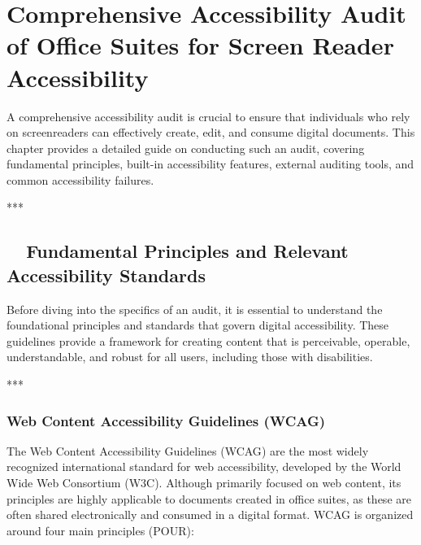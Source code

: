 \chapter{Comprehensive Accessibility Audit of Office Suites for Screen Reader Accessibility}
\label{cha:comprehensive-accessibility-audit-of-office-suites-for-screen-reader-accessibility}

A comprehensive \gls{accessibility} audit is crucial to ensure that individuals who rely on \gls{screenreader}s can effectively create, edit, and consume digital documents. This chapter provides a detailed guide on conducting such an audit, covering fundamental principles, built-in accessibility features, external auditing tools, and common accessibility failures.

***

\section{~~Fundamental Principles and Relevant Accessibility Standards}
\label{sec:fundamental-principles-and-relevant-accessibility-standards}

Before diving into the specifics of an audit, it is essential to understand the foundational principles and standards that govern digital accessibility. These guidelines provide a framework for creating content that is perceivable, operable, understandable, and robust for all users, including those with disabilities.

***

\subsection{Web Content Accessibility Guidelines (WCAG)}
\label{sub:web-content-accessibility-guidelines-wcag}

The Web Content Accessibility Guidelines (\gls{WCAG}) are the most widely recognized international standard for web accessibility, developed by the World Wide Web Consortium (W3C). Although primarily focused on web content, its principles are highly applicable to documents created in office suites, as these are often shared electronically and consumed in a digital format. \gls{WCAG} is organized around four main principles (POUR)\supercite{WCAGGuidelines}:


